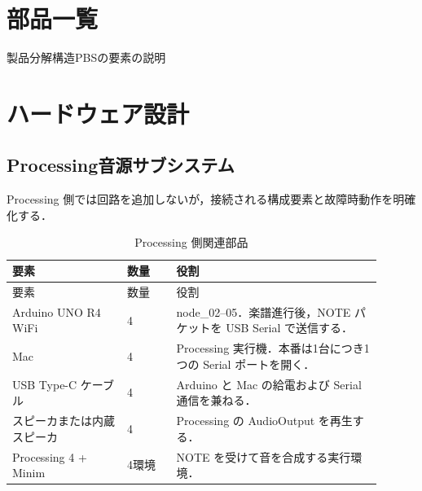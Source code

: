 \documentclass[lualatex,book,paper=a4paper,jafontsize=11.5pt,jafontscale=1.05]{jlreq}
\begin{document}
\section{部品一覧}
製品分解構造PBSの要素の説明

\section{ハードウェア設計}
\subsection{Processing音源サブシステム}
Processing 側では回路を追加しないが，接続される構成要素と故障時動作を明確化する．

\begin{longtable}{p{0.28\linewidth}p{0.12\linewidth}p{0.50\linewidth}}
\caption{Processing 側関連部品}\label{tab:parts}\\
\toprule
要素 & 数量 & 役割 \\
\midrule
\endfirsthead
\toprule
要素 & 数量 & 役割 \\
\midrule
\endhead
Arduino UNO R4 WiFi & 4 & node\_02--05．楽譜進行後，NOTE パケットを USB Serial で送信する． \\
Mac & 4 & Processing 実行機．本番は1台につき1つの Serial ポートを開く． \\
USB Type-C ケーブル & 4 & Arduino と Mac の給電および Serial 通信を兼ねる． \\
スピーカまたは内蔵スピーカ & 4 & Processing の AudioOutput を再生する． \\
Processing 4 + Minim & 4環境 & NOTE を受けて音を合成する実行環境． \\
\bottomrule
\end{longtable}
\end{document}
